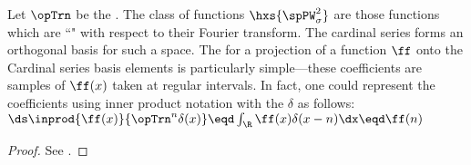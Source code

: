 \begin{example}
\label{ex:TD_cardinalseries}
Let $\opTrn$ be the  .
The  class of functions $\hxs{\spPW_\sigma^2}$
are those functions which are ``"
with respect to their Fourier transform.
The cardinal series forms an orthogonal basis for such a space.
The  for a projection of a function $\ff$ onto the Cardinal series basis elements is particularly
simple---these coefficients are samples of $\ff(x)$ taken at regular intervals.
In fact, one could represent the coefficients using inner product notation with the
 $\delta$  as
follows: %
  \\\indentx$\ds\inprod{\ff(x)}{\opTrn^n\delta(x)} \eqd \int_{\R} \ff(x)\delta(x-n) \dx \eqd \ff(n)$
\end{example}

\begin{example}
\label{ex:TD_fs}
\end{example}
\begin{proof}
See .
\end{proof}


